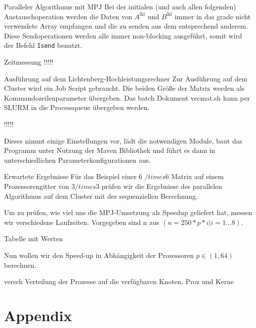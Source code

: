 \documentclass[
ngerman,
subtask=ruled %
]{tudaexercise}
\begin{document}
\begin{task}{Paralleler Algorithmus mit MPJ}
		Bei der initialen (und auch allen folgenden) Austauschoperation werden die Daten von $A^{\mathrm{lkl}}$ und $B^{\mathrm{lkl}}$ immer in das grade nicht verwendete Array empfangen und die zu senden aus dem entsprechend anderem.
		Diese Sendoperationen werden alle immer non-blocking ausgeführt, somit wird der Befehl \texttt{Isend} benutzt.
	\end{task}
	
	\begin{task}{Zeitmessung}
		!!!!!
	
		
	\end{task}
	
	\begin{task}{Ausführung auf dem Lichtenberg-Hochleistungsrechner} 
		Zur Ausführung auf dem Cluster wird ein Job Script gebraucht. 
		Die beiden Größe der Matrix werden als Kommandozeilenparameter übergeben.
		Das batch Dokument vecmat.sh kann per SLURM in die Processqueue übergeben werden.
		
		!!!!!
		
		Dieses nimmt einige Einstellungen vor, lädt die notwendigen Module, baut das Programm unter Nutzung der Maven Bibliothek und führt es dann in unterschiedlichen Parameterkonfigurationen aus.
	\end{task}

	

	\begin{task} {Erwartete Ergebnisse}
		Für das Beispiel einer 6 $/times$6 Matrix auf einem Prozessorengitter von 3$/times$3 prüfen wir die Ergebnisse des parallelen Algorithmus auf dem Cluster mit der sequenziellen Berechnung.
		
		Um zu prüfen, wie viel uns die MPJ-Umsetzung als Speedup geliefert hat, messen wir verschiedene Laufzeiten.
		Vorgegeben sind n aus $(n = 250 * p * i | i=1...8)$.
		
		Tabelle mit Werten
		
		Nun wollen wir den Speed-up in Abhängigkeit der Prozessoren $p \in (1, 64)$ berechnen.
		
		versch Verteilung der Prozesse auf die verfügbaren Knoten, Proz und Kerne
	\end{task}


	\appendix
	\section{Appendix}
	

	
	
\end{document}
